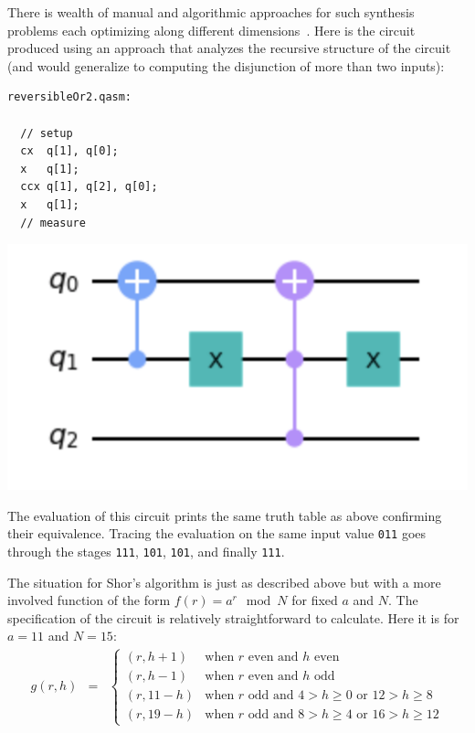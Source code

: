 There is wealth of manual and algorithmic approaches for such synthesis problems each optimizing along  different dimensions~\cite{XXX}. Here is the circuit produced using an approach that analyzes the recursive structure of the circuit (and would generalize to computing the disjunction of more than two inputs):

\begin{center}
  \begin{minipage}[c]{0.4\linewidth}
\begin{verbatim}
reversibleOr2.qasm:

  // setup
  cx  q[1], q[0];
  x   q[1];
  ccx q[1], q[2], q[0];
  x   q[1];
  // measure
  \end{verbatim}
  \end{minipage}
  \qquad
  \includegraphics[scale=0.7]{reversibleOr2.png}
\end{center}

\noindent The evaluation of this circuit prints the same truth table as above confirming their equivalence. Tracing the
evaluation on the same input value \verb|011| goes through the stages \verb|111|, \verb|101|, \verb|101|, and finally \verb|111|.

The situation for Shor's algorithm is just as described above but with a more involved function of the form $f(r) = a^{r} \mod N$ for fixed $a$ and $N$. The specification of the circuit is relatively straightforward to calculate. Here it is for $a=11$ and $N=15$:
\[\begin{array}{rcll}
g(r,h) &=& \left\{ \begin{array}{ll}
                     (r,h+1) & \mbox{when~$r$~even~and~$h$~even} \\
                     (r,h-1) & \mbox{when~$r$~even~and~$h$~odd} \\
                     (r,11-h) & \mbox{when~$r$~odd~and~$4 > h \geq 0$~or~$12 > h \geq 8$} \\
                     (r,19-h) & \mbox{when~$r$~odd~and~$8 > h \geq 4$~or~$16 > h \geq 12$}
                                \end{array}\right.
\end{array}\]

